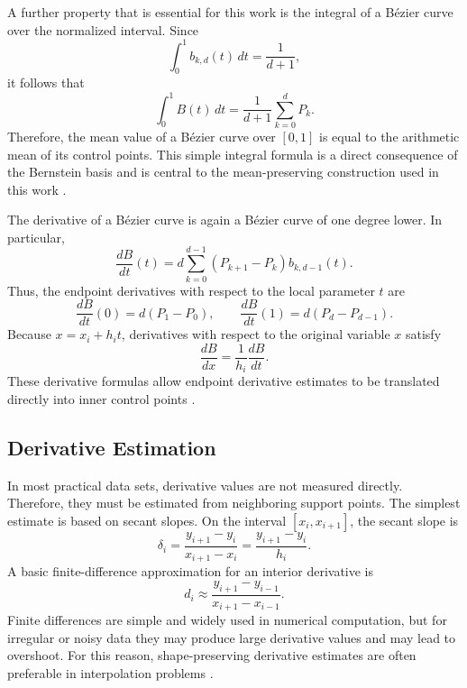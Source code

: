 \documentclass[12pt,a4paper]{article}
\begin{document}
A further property that is essential for this work is the integral of a B\'ezier curve over the normalized interval. Since
\[
\int_0^1 b_{k,d}(t)\,dt=\frac{1}{d+1},
\]
it follows that
\[
\int_0^1 B(t)\,dt
=
\frac{1}{d+1}
\sum_{k=0}^{d} P_k.
\]
Therefore, the mean value of a B\'ezier curve over \([0,1]\) is equal to the arithmetic mean of its control points. This simple integral formula is a direct consequence of the Bernstein basis and is central to the mean-preserving construction used in this work \cite{farin2002curves,pomaxBezierPrimer}.

The derivative of a B\'ezier curve is again a B\'ezier curve of one degree lower. In particular,
\[
\frac{dB}{dt}(t)
=
d\sum_{k=0}^{d-1}(P_{k+1}-P_k)b_{k,d-1}(t).
\]
Thus, the endpoint derivatives with respect to the local parameter \(t\) are
\[
\frac{dB}{dt}(0)=d(P_1-P_0),
\qquad
\frac{dB}{dt}(1)=d(P_d-P_{d-1}).
\]
Because \(x=x_i+h_i t\), derivatives with respect to the original variable \(x\) satisfy
\[
\frac{dB}{dx}=\frac{1}{h_i}\frac{dB}{dt}.
\]
These derivative formulas allow endpoint derivative estimates to be translated directly into inner control points \cite{farin2002curves,piegl1997nurbs,mitBezierProperties}.

\subsection{Derivative Estimation}

In most practical data sets, derivative values are not measured directly. Therefore, they must be estimated from neighboring support points. The simplest estimate is based on secant slopes. On the interval \([x_i,x_{i+1}]\), the secant slope is
\[
\delta_i=
\frac{y_{i+1}-y_i}{x_{i+1}-x_i}
=
\frac{y_{i+1}-y_i}{h_i}.
\]
A basic finite-difference approximation for an interior derivative is
\[
d_i\approx
\frac{y_{i+1}-y_{i-1}}{x_{i+1}-x_{i-1}}.
\]
Finite differences are simple and widely used in numerical computation, but for irregular or noisy data they may produce large derivative values and may lead to overshoot. For this reason, shape-preserving derivative estimates are often preferable in interpolation problems \cite{deboor1978splines,fritsch1980monotone,fritsch1984monotone}.
\end{document}
